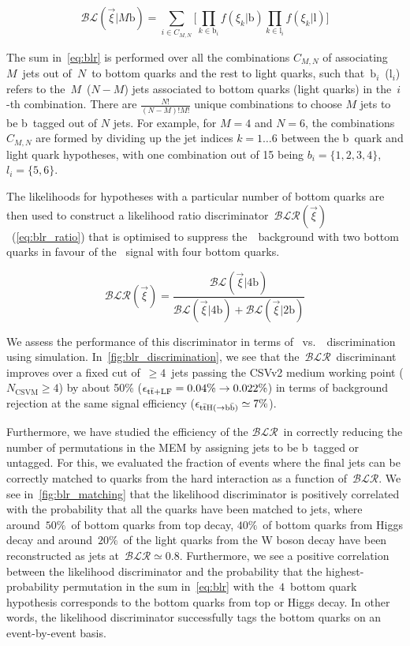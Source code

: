 \begin{equation}
\label{eq:blr}
\mathcal{BL}(\vec{\xi} | M\mathrm{b}) = \sum_{i \in C_{M,N}} \biggl[ \prod_{k \in \mathrm{b}_i} f(\xi_k | \mathrm{b}) \prod_{k \in \mathrm{l}_i} f(\xi_k | \mathrm{l}) \biggr]
\end{equation}

The sum in~\cref{eq:blr} is performed over all the combinations $C_{M,N}$ of associating~$M$~jets out of~$N$~to bottom quarks and the rest to light quarks, such that~$\mathrm{b}_i$~($\mathrm{l}_i$) refers to the~$M$~($N-M$) jets associated to bottom quarks (light quarks) in the~$i$-th combination. There are $\frac{N!}{(N-M)!M!}$ unique combinations to choose $M$ jets to be b~tagged out of $N$ jets. For example, for $M=4$ and $N=6$, the combinations $C_{M,N}$ are formed by dividing up the jet indices $k=1\dots6$ between the b~quark and light quark hypotheses, with one combination out of 15 being $b_i = \{1,2,3,4\}$, $l_i = \{5,6\}$.

The likelihoods for hypotheses with a particular number of bottom quarks are then used to construct a likelihood ratio discriminator~$\mathcal{BLR}(\vec{\xi})$~(\cref{eq:blr_ratio}) that is optimised to suppress the~\ttlf~background with two bottom quarks in favour of the~\ttHbb\xspace signal with four bottom quarks.

\begin{equation}
\label{eq:blr_ratio}
\mathcal{BLR}(\vec{\xi}) = \frac{\mathcal{BL}(\vec{\xi} | 4\mathrm{b})}{\mathcal{BL}(\vec{\xi} | 4\mathrm{b}) + \mathcal{BL}(\vec{\xi} | 2\mathrm{b})}
\end{equation}

We assess the performance of this discriminator in terms of \ttHbb\ vs.~\ttlf~discrimination using simulation. In~\cref{fig:blr_discrimination}, we see that the~$\mathcal{BLR}$~discriminant improves over a fixed cut of~$\ge4$~jets passing the CSVv2 medium working point ($N_{\mathrm{CSVM}} \ge 4$) by about 50\% ($\epsilon_{\mathrm{t} \bar{\mathrm{t}} + \mathrm{LF}} = 0.04\% \rightarrow 0.022\%$) in terms of background rejection at the same signal efficiency ($\epsilon_{\mathrm{t} \bar{\mathrm{t}} \mathrm{H} (\rightarrow \mathrm{b}\bar{\mathrm{b}})} \simeq 7\%$).

Furthermore, we have studied the efficiency of the $\mathcal{BLR}$~in correctly reducing the number of permutations in the MEM by assigning jets to be b~tagged or untagged. For this, we evaluated the fraction of events where the final jets can be correctly matched to quarks from the hard interaction as a function of~$\mathcal{BLR}$. We see in~\cref{fig:blr_matching} that the likelihood discriminator is positively correlated with the probability that all the quarks have been matched to jets, where around~$50\%$~of bottom quarks from top decay, $40\%$~of bottom quarks from Higgs decay and around~$20\%$~of the light quarks from the W boson decay have been reconstructed as jets at~$\mathcal{BLR} \simeq 0.8$. Furthermore, we see a positive correlation between the likelihood discriminator and the probability that the highest-probability permutation in the sum in~\cref{eq:blr} with the~$4$~bottom quark hypothesis corresponds to the bottom quarks from top or Higgs decay. In other words, the likelihood discriminator successfully tags the bottom quarks on an event-by-event basis.


